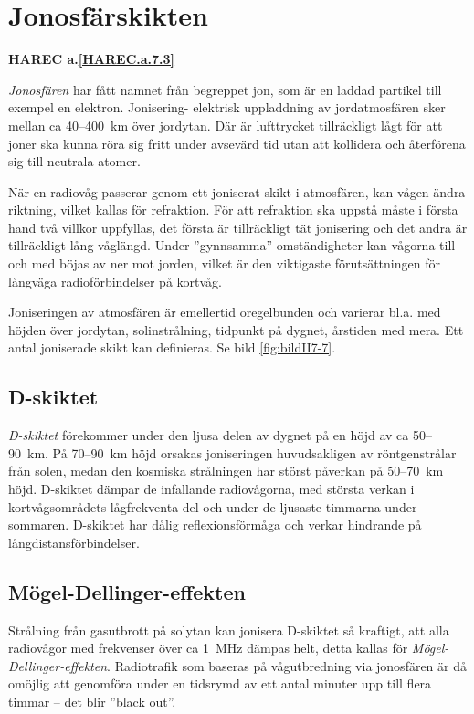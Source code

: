 \section{Jonosfärskikten}
\textbf{
HAREC a.\ref{HAREC.a.7.3}\label{myHAREC.a.7.3}
}

\emph{Jonosfären} har fått namnet från begreppet jon, som är en laddad
partikel till exempel en elektron.
Jonisering- elektrisk uppladdning av jordatmosfären sker mellan ca 40--400~km
över jordytan.
Där är lufttrycket tillräckligt lågt för att joner ska kunna röra sig fritt
under avsevärd tid utan att kollidera och återförena sig till neutrala atomer.

När en radiovåg passerar genom ett joniserat skikt i atmosfären, kan
vågen ändra riktning, vilket kallas för refraktion.  För att
refraktion ska uppstå måste i första hand två villkor uppfyllas, det
första är tillräckligt tät jonisering och det andra är tillräckligt
lång våglängd.
Under ''gynnsamma'' omständigheter kan vågorna till och med böjas av
ner mot jorden, vilket är den viktigaste förutsättningen för långväga
radioförbindelser på kortvåg.

Joniseringen av atmosfären är emellertid oregelbunden och varierar
bl.a. med höjden över jordytan, solinstrålning, tidpunkt på dygnet,
årstiden med mera.  Ett antal joniserade skikt kan definieras.  Se
bild \ref{fig:bildII7-7}.

\subsection{D-skiktet}

\emph{D-skiktet} förekommer under den ljusa delen av dygnet på en höjd av ca
50--90~km.
På 70--90~km höjd orsakas joniseringen huvudsakligen av röntgenstrålar från
solen, medan den kosmiska strålningen har störst påverkan på 50--70~km höjd.
D-skiktet dämpar de infallande radiovågorna, med största verkan i
kortvågsområdets lågfrekventa del och under de ljusaste timmarna under sommaren.
D-skiktet har dålig reflexionsförmåga och verkar hindrande på
långdistansförbindelser.

\subsection{Mögel-Dellinger-effekten}

Strålning från gasutbrott på solytan kan jonisera D-skiktet så
kraftigt, att alla radiovågor med frekvenser över ca 1~MHz dämpas helt,
detta kallas för \emph{Mögel-Dellinger-effekten}.
Radiotrafik som baseras på vågutbredning via jonosfären är då
omöjlig att genomföra under en tidsrymd av ett antal minuter upp till
flera timmar -- det blir ''black out''.

